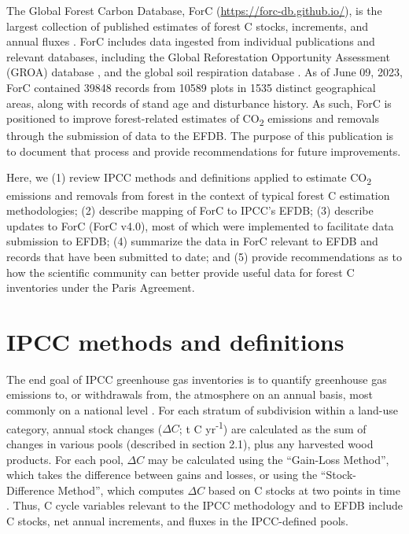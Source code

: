 \documentclass[, manuscript]{copernicus}
\begin{document}
The Global Forest Carbon Database, ForC
(\url{https://forc-db.github.io/}), is the largest collection of
published estimates of forest C stocks, increments, and annual fluxes
\citep{anderson-teixeira_forc_2018, anderson-teixeira_carbon_2021}. ForC
includes data ingested from individual publications and relevant
databases, including the Global Reforestation Opportunity Assessment
(GROA) database \citep[database doi:
10.5281/zenodo.3983644]{cook-patton_mapping_2020}, and the global soil
respiration database
\citep[SRDB-V5,][]{bond-lamberty_global_2010, jian_restructured_2021}.
As of June 09, 2023, ForC contained 39848 records from 10589 plots in
1535 distinct geographical areas, along with records of stand age and
disturbance history. As such, ForC is positioned to improve
forest-related estimates of CO\textsubscript{2} emissions and removals
through the submission of data to the EFDB. The purpose of this
publication is to document that process and provide recommendations for
future improvements.

Here, we (1) review IPCC methods and definitions applied to estimate
CO\textsubscript{2} emissions and removals from forest in the context of
typical forest C estimation methodologies; (2) describe mapping of ForC
to IPCC's EFDB; (3) describe updates to ForC (ForC v4.0), most of which
were implemented to facilitate data submission to EFDB; (4) summarize
the data in ForC relevant to EFDB and records that have been submitted
to date; and (5) provide recommendations as to how the scientific
community can better provide useful data for forest C inventories under
the Paris Agreement.

\section{IPCC methods and definitions}

The end goal of IPCC greenhouse gas inventories is to quantify
greenhouse gas emissions to, or withdrawals from, the atmosphere on an
annual basis, most commonly on a national level
\citep{ipcc_2006_2006, ipcc_2019_2019}. For each stratum of subdivision
within a land-use category, annual stock changes (\(\Delta C\); t C
yr\textsuperscript{-1}) are calculated as the sum of changes in various
pools (described in section 2.1), plus any harvested wood products. For
each pool, \(\Delta C\) may be calculated using the ``Gain-Loss
Method'', which takes the difference between gains and losses, or using
the ``Stock-Difference Method'', which computes \(\Delta C\) based on C
stocks at two points in time \citep{ipcc_2006_2006}. Thus, C cycle
variables relevant to the IPCC methodology and to EFDB include C stocks,
net annual increments, and fluxes in the IPCC-defined pools.
\end{document}
